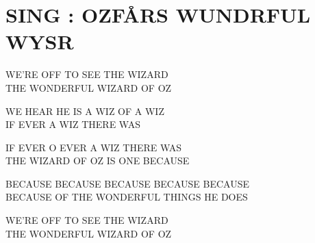 \begin{comment}
\begin{tabular}{|p{3.7cm}|p{3.7cm}|p{3.7cm}|}\hline
SING&SONG&CHANSON\\\hline
\large{\textbf{Ubr sit Drizl-$\pi$r}} &
\large{\textbf{Par-delà l'arc-en-ciel}} &
\large{\textbf{Over the Rainbow}}
\end{tabular}\par
\end{comment}
\section*{SING : OZFÅRS WUNDRFUL WYSR}
WE'RE OFF TO SEE THE WIZARD\\
THE WONDERFUL WIZARD OF OZ\par

WE HEAR HE IS A WIZ OF A WIZ\\
IF EVER A WIZ THERE WAS\par

IF EVER O EVER A WIZ THERE WAS\\
THE WIZARD OF OZ IS ONE BECAUSE\par

BECAUSE BECAUSE BECAUSE BECAUSE BECAUSE\\
BECAUSE OF THE WONDERFUL THINGS HE DOES\par

WE'RE OFF TO SEE THE WIZARD\\
THE WONDERFUL WIZARD OF OZ\par